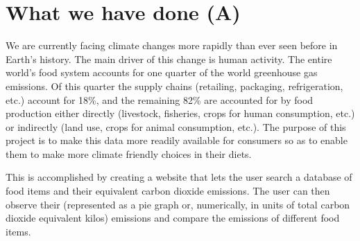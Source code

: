 \section{What we have done (A)}
We are currently facing climate changes more rapidly than ever seen before in Earth’s history. The main driver of this change is human activity. The entire world’s food system accounts for one quarter of the world greenhouse gas emissions. Of this quarter the supply chains (retailing, packaging, refrigeration, etc.) account for 18\%, and the remaining 82\% are accounted for by food production either directly (livestock, fisheries, crops for human consumption, etc.) or indirectly (land use, crops for animal consumption, etc.)\cite{FoodStat}. The purpose of this project is to make this data more readily available for consumers so as to enable them to make more climate friendly choices in their diets. 

This is accomplished by creating a website that lets the user search a database of food items and their equivalent carbon dioxide emissions. The user can then observe their (represented as a pie graph or, numerically, in units of total carbon dioxide equivalent kilos) emissions and compare the emissions of different food items. 
